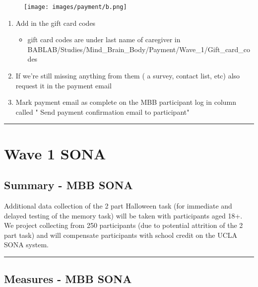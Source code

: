\documentclass[
]{book}
\providecommand{\tightlist}{%
  \setlength{\itemsep}{0pt}\setlength{\parskip}{0pt}}
\begin{document}
\begin{figure}
\centering
\texttt{[image: images/payment/b.png]}
\caption{}
\end{figure}

\begin{enumerate}
\def\labelenumi{\arabic{enumi}.}
\setcounter{enumi}{2}
\item
  Add in the gift card codes

  \begin{itemize}
  \tightlist
  \item
    gift card codes are under last name of caregiver in BABLAB/Studies/Mind\_Brain\_Body/Payment/Wave\_1/Gift\_card\_codes
  \end{itemize}
\item
  If we're still missing anything from them ( a survey, contact list, etc) also request it in the payment email
\item
  Mark payment email as complete on the MBB participant log in column called " Send payment confirmation email to participant"
\end{enumerate}

\begin{center}\rule{0.5\linewidth}{0.5pt}\end{center}

\hypertarget{wave-1-sona}{%
\chapter{Wave 1 SONA}\label{wave-1-sona}}

\hypertarget{summary---mbb-sona}{%
\section{Summary - MBB SONA}\label{summary---mbb-sona}}

Additional data collection of the 2 part Halloween task (for immediate and delayed testing of the memory task) will be taken with participants aged 18+. We project collecting from 250 participants (due to potential attrition of the 2 part task) and will compensate participants with school credit on the UCLA SONA system.

\begin{center}\rule{0.5\linewidth}{0.5pt}\end{center}

\hypertarget{measures---mbb-sona}{%
\section{Measures - MBB SONA}\label{measures---mbb-sona}}
\end{document}
